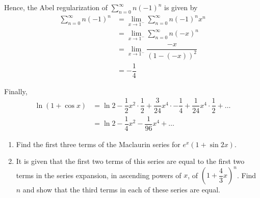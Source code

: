 \documentclass{jhwhw}
\begin{document}
        Hence, the Abel regularization of $\sum\limits_{n=0}^\infty n(-1)^n$ is given by
        \begin{align*}
            \sum_{n=0}^\infty n(-1)^n &= \lim_{x \to 1^-} \sum_{n=0}^\infty n(-1)^n x^n\\
            &= \lim_{x \to 1^-} \sum_{n=0}^\infty n(-x)^n\\
            &= \lim_{x \to 1^-} \dfrac{-x}{(1-(-x))^2}\\
            &= -\dfrac14
        \end{align*}

        Finally,
        \begin{align*}
            \ln (1 + \cos x) &= \ln 2 - \dfrac12 x^2 \cdot \dfrac12 + \dfrac{3}{24} x^4 \cdot -\dfrac14 + \dfrac1{24} x^4 \cdot\dfrac12 + \ldots\\
            &= \ln 2 - \dfrac14 x^2 - \dfrac1{96}x^4 + \ldots
        \end{align*}

     
    \problem{}
        \begin{enumerate}
            \item Find the first three terms of the Maclaurin series for $e^x (1 + \sin 2x)$.
            \item It is given that the first two terms of this series are equal to the first two terms in the series expansion, in ascending powers of $x$, of $\left(1 + \dfrac43 x\right)^n$. Find $n$ and show that the third terms in each of these series are equal.
        \end{enumerate}
        
    \solution
\end{document}
